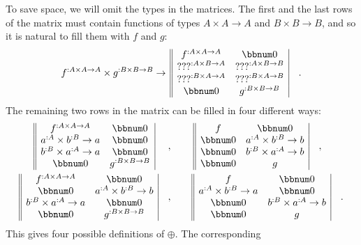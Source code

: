 To save space, we will omit the types in the matrices. The first and
the last rows of the matrix must contain functions of types $A\times A\rightarrow A$
and $B\times B\rightarrow B$, and so it is natural to fill them with
$f$ and $g$:
\[
f^{:A\times A\rightarrow A}\times g^{:B\times B\rightarrow B}\rightarrow\,\begin{array}{||cc|}
f^{:A\times A\rightarrow A} & \bbnum 0\\
\text{???}^{:A\times B\rightarrow A} & \text{???}^{:A\times B\rightarrow B}\\
\text{???}^{:B\times A\rightarrow A} & \text{???}^{:B\times A\rightarrow B}\\
\bbnum 0 & g^{:B\times B\rightarrow B}
\end{array}\quad.
\]
The remaining two rows in the matrix can be filled in four different
ways:
\begin{align*}
\begin{array}{||cc|}
f^{:A\times A\rightarrow A} & \bbnum 0\\
a^{:A}\times b^{:B}\rightarrow a & \bbnum 0\\
b^{:B}\times a^{:A}\rightarrow a & \bbnum 0\\
\bbnum 0 & g^{:B\times B\rightarrow B}
\end{array}~\quad,\quad\quad & ~\begin{array}{||cc|}
f & \bbnum 0\\
\bbnum 0 & a^{:A}\times b^{:B}\rightarrow b\\
\bbnum 0 & b^{:B}\times a^{:A}\rightarrow b\\
\bbnum 0 & g
\end{array}\quad,\\
\begin{array}{||cc|}
f^{:A\times A\rightarrow A} & \bbnum 0\\
\bbnum 0 & a^{:A}\times b^{:B}\rightarrow b\\
b^{:B}\times a^{:A}\rightarrow a & \bbnum 0\\
\bbnum 0 & g^{:B\times B\rightarrow B}
\end{array}\quad,\quad\quad & \,\begin{array}{||cc|}
f & \bbnum 0\\
a^{:A}\times b^{:B}\rightarrow a & \bbnum 0\\
\bbnum 0 & b^{:B}\times a^{:A}\rightarrow b\\
\bbnum 0 & g
\end{array}\quad.
\end{align*}
This gives four possible definitions of $\oplus$. The corresponding
